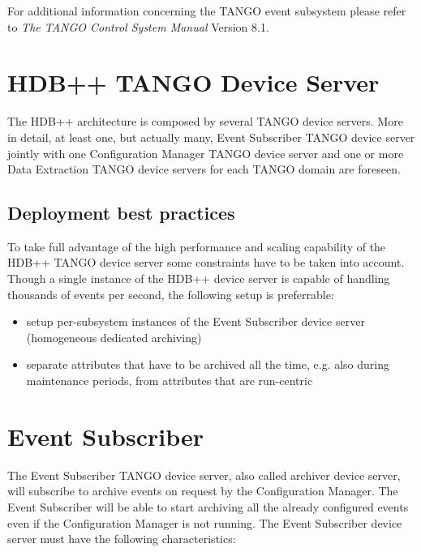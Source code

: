 \documentclass[11pt,a4paper]{article}
\def \hdb{HDB++}
\def \es{Event Subscriber}
\def \cm{Configuration Manager}
\def \de{Data Extraction}
\def \tango{TANGO}
\begin{document}
For additional information concerning the \tango{} event subsystem
please refer to \emph{The \tango{} Control System Manual} Version 8.1.


\newpage{\clearpage}

\section{\hdb{} \tango{} Device Server}
The \hdb{} architecture is composed by several \tango{} device servers.
More in detail, at least one, but actually many, \es{} \tango{} device
server jointly with one \cm{} \tango{} device server and one or
more \de{} \tango{} device servers for each \tango{} domain are foreseen.

\subsection{Deployment best practices}
To take full advantage of the high performance and scaling capability
of the \hdb{} \tango{} device server some constraints have to be
taken into account.
Though a single instance of the \hdb{} device server is capable of
handling thousands of events per second, the following setup is
preferrable:
\begin{itemize}
	\item setup per-subsystem instances of the \es{} device server
				(homogeneous dedicated archiving)
	\item separate attributes that have to be archived all the time, e.g.
				also during maintenance periods, from attributes that are
				run-centric
\end{itemize}


\newpage{\clearpage}

\section{\es}
\label{es}
The \es{} \tango{} device server, also called archiver device server,
will subscribe to archive events on request by the \cm. The \es{} will
be able to start archiving all the already configured events even if
the \cm{} is not running. The \es{} device server must have the following
characteristics:
\end{document}
